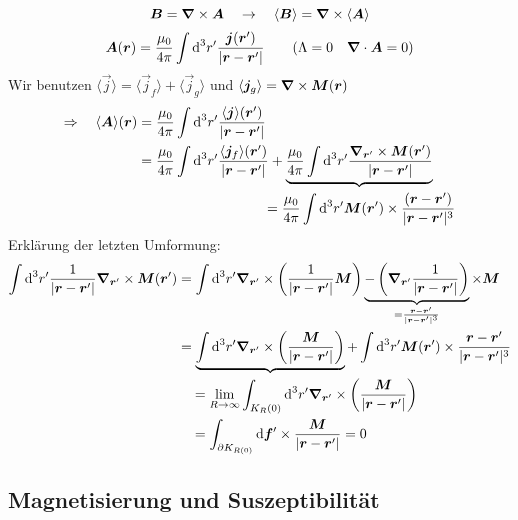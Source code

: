 \begin{equation*}
\bm{B} = \bm{\nabla} \times \bm{A} \quad \rightarrow \quad \langle \bm{B} \rangle = \bm{\nabla} \times \langle \bm{A} \rangle
\end{equation*}
\begin{equation*}
\bm{A} (\bm{r}) = \frac{\mu_0}{4 \pi} \int \textrm{d} ^3 r' \frac{\bm{j}(\bm{r}')}{|\bm{r} - \bm{r}'|} \qquad (\Lambda = 0 \quad \bm{\nabla} \cdot \bm{A} = 0)
\end{equation*}
Wir benutzen $ \langle \vec{j} \rangle = \langle \vec{j}_f \rangle + \langle \vec{j}_g \rangle $ und $ \langle \bm{j}_g \rangle = \bm{\nabla} \times \bm{M}(\bm{r}) $
\begin{align*}
\Rightarrow \quad \langle \bm{A} \rangle (\bm{r}) &= \frac{\mu_0}{4 \pi} \int \textrm{d}^3r' \frac{\langle \bm{j} \rangle (\bm{r}')}{|\bm{r} - \bm{r}'|}\\
&= \frac{\mu_0}{4 \pi} \int \textrm{d}^3 r' \frac{\langle \bm{j}_f \rangle (\bm{r}')}{|\bm{r} - \bm{r}'|} + \underbrace{\frac{\mu_0}{4 \pi} \int\textrm{d}^3 r ' \frac{\bm{\nabla}_{\bm{r}'} \times \bm{M} (\bm{r}')}{|\bm{r} - \bm{r}'|}}\\
& \qquad \qquad \qquad \qquad \quad = \frac{\mu_0}{4 \pi} \int \textrm{d}^3 r' \bm{M}(\bm{r}') \times \frac{(\bm{r} - \bm{r}')}{|\bm{r} - \bm{r}'|^3}
\end{align*}
Erklärung der letzten Umformung:
\begin{align*}
\int \textrm{d}^3 r' \frac{1}{|\bm{r} - \bm{r}'|} \bm{\nabla}_{\bm{r}'} \times \bm{M} (\bm{r}') &= \int \textrm{d}^3 r' \bm{\nabla}_{\bm{r}'} \times \left(\frac{1}{|\bm{r} - \bm{r}'|} \bm{M}\right) \underbrace{- \left(\bm{\nabla}_{\bm{r}'} \frac{1}{|\bm{r} - \bm{r}'|}\right)}_{= \frac{\bm{r} - \bm{r}'}{|\bm{r} - \bm{r}'|^3}} \times \bm{M}\\
&= \underbrace{\int\textrm{d}^3 r' \bm{\nabla}_{\bm{r}'} \times \left(\frac{\bm{M}}{|\bm{r} - \bm{r}'|}\right)} + \int\textrm{d}^3r' \bm{M}(\bm{r}')  \times \frac{\bm{r} - \bm{r}'}{|\bm{r} - \bm{r}'|^3}\\
&\quad = \lim\limits_{R \to \infty} \int_{K_R(0)} \textrm{d}^3 r' \bm{\nabla}_{\bm{r}'} \times \left(\frac{\bm{M}}{|\bm{r} - \bm{r}'|}\right)\\
&\quad = \int_{\partial K_{R(0)}} \textrm{d} \bm{f}' \times \frac{\bm{M}}{|\bm{r} - \bm{r}'|} = 0
\end{align*}

\subsection{Magnetisierung und Suszeptibilität}

